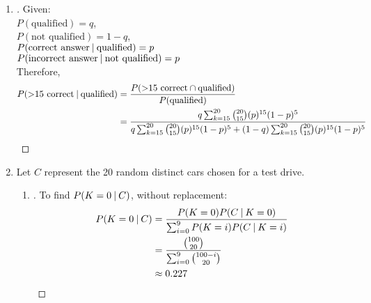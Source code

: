 \documentclass[paper=usletter, fontsize=12pt]{article}
\begin{document}
\begin{enumerate}
        \item
        \begin{proof}[\unskip\nopunct]
            Given: \\
            $P(\text{qualified}) = q$,\\
            $P(\text{not qualified}) = 1-q$,\\
            $P(\text{correct answer} \:\vert\: \text{qualified}) = p$ \\
            $P(\text{incorrect answer} \:\vert\: \text{not qualified}) = p$ \\
            Therefore,
            \begingroup
            \addtolength{\jot}{1em}
            \begin{align*}
                P(\text{>15 correct} \:\vert\: \text{qualified}) & = \frac{P(\text{>15 correct} \cap \text{qualified})}{P(\text{qualified})} \\
                & = \frac{q \sum_{k=15}^{20} \binom{20}{15}(p)^{15}(1-p)^5}{q\sum_{k=15}^{20} \binom{20}{15}(p)^{15}(1-p)^5 + (1-q)\sum_{k=15}^{20} \binom{20}{15}(p)^{15}(1-p)^5} \qedhere
            \end{align*}
            \endgroup
        \end{proof}
        \vspace{0.2in}

        \item Let $C$ represent the 20 random distinct cars chosen for a
        test drive.

            \begin{enumerate}

                \item
                \begin{proof}[\unskip\nopunct]
                    To find $P(K=0 \:\vert\: C)$, without replacement:
                    \begingroup
                    \addtolength{\jot}{1em}
                    \begin{align*}
                        P(K=0 \:\vert\: C) & = \frac{P(K=0)P(C \:\vert\: K=0)}{\sum_{i=0}^{9}P(K=i)P(C \:\vert\: K=i)} \\
                        & = \frac{\binom{100}{20}}{\sum_{i=0}^{9}\binom{100-i}{20}}\\
                        & \approx 0.227 \qedhere
                    \end{align*}
                    \endgroup
                \end{proof}
                \vspace{0.2in}


\end{enumerate}
\end{enumerate}
\end{document}
